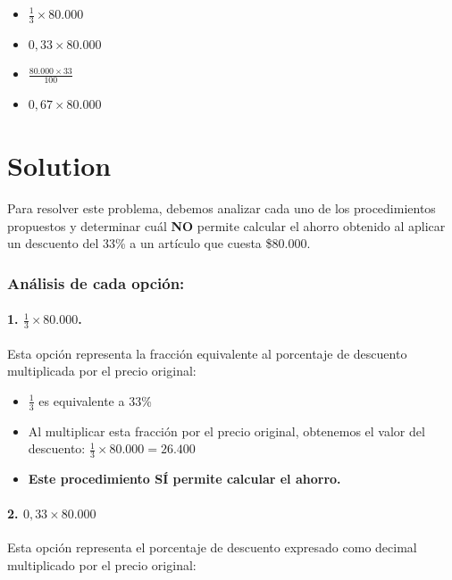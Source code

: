 \documentclass[
]{article}
\providecommand{\tightlist}{%
  \setlength{\itemsep}{0pt}\setlength{\parskip}{0pt}}
\begin{document}
\begin{itemize}
\tightlist
\item
  \(\frac{1}{3} \times 80.000\)
\item
  \(0,33 \times 80.000\)
\item
  \(\frac{80.000 \times 33}{100}\)
\item
  \(0,67 \times 80.000\)
\end{itemize}

\section{Solution}\label{solution}

Para resolver este problema, debemos analizar cada uno de los
procedimientos propuestos y determinar cuál \textbf{NO} permite calcular
el ahorro obtenido al aplicar un descuento del 33\% a un artículo que
cuesta \$80.000.

\subsubsection{Análisis de cada
opción:}\label{anuxe1lisis-de-cada-opciuxf3n}

\paragraph{\texorpdfstring{1.
\(\frac{1}{3} \times 80.000\).}{1. \textbackslash frac\{1\}\{3\} \textbackslash times 80.000.}}\label{frac13-times-80.000.}

Esta opción representa la fracción equivalente al porcentaje de
descuento multiplicada por el precio original:

\begin{itemize}
\tightlist
\item
  \(\frac{1}{3}\) es equivalente a 33\%
\item
  Al multiplicar esta fracción por el precio original, obtenemos el
  valor del descuento: \(\frac{1}{3} \times 80.000 = 26.400\)
\item
  \textbf{Este procedimiento SÍ permite calcular el ahorro.}
\end{itemize}

\paragraph{\texorpdfstring{2.
\(0,33 \times 80.000\)}{2. 0,33 \textbackslash times 80.000}}\label{times-80.000}

Esta opción representa el porcentaje de descuento expresado como decimal
multiplicado por el precio original:
\end{document}
